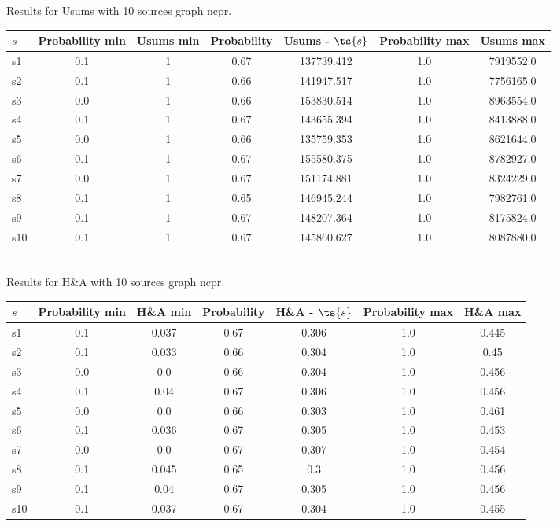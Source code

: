 \documentclass{article}
\begin{document}
\noindent Results for Usums with 10 sources graph ncpr.

\noindent\begin{tabular}{|l|c|c|c|c|c|c|}
\hline
$s$& Probability min & Usums min & Probability & Usums - $\ts{s}$ & Probability max & Usums max\\
\hline
s1 &0.1 & 1 & 0.67 & 137739.412 & 1.0 & 7919552.0\\
\hline
s2 &0.1 & 1 & 0.66 & 141947.517 & 1.0 & 7756165.0\\
\hline
s3 &0.0 & 1 & 0.66 & 153830.514 & 1.0 & 8963554.0\\
\hline
s4 &0.1 & 1 & 0.67 & 143655.394 & 1.0 & 8413888.0\\
\hline
s5 &0.0 & 1 & 0.66 & 135759.353 & 1.0 & 8621644.0\\
\hline
s6 &0.1 & 1 & 0.67 & 155580.375 & 1.0 & 8782927.0\\
\hline
s7 &0.0 & 1 & 0.67 & 151174.881 & 1.0 & 8324229.0\\
\hline
s8 &0.1 & 1 & 0.65 & 146945.244 & 1.0 & 7982761.0\\
\hline
s9 &0.1 & 1 & 0.67 & 148207.364 & 1.0 & 8175824.0\\
\hline
s10 &0.1 & 1 & 0.67 & 145860.627 & 1.0 & 8087880.0\\
\hline
\end{tabular}\\

\noindent Results for H\&A with 10 sources graph ncpr.

\noindent\begin{tabular}{|l|c|c|c|c|c|c|}
\hline
$s$& Probability min & H\&A min & Probability & H\&A - $\ts{s}$ & Probability max & H\&A max\\
\hline
s1 &0.1 & 0.037 & 0.67 & 0.306 & 1.0 & 0.445\\
\hline
s2 &0.1 & 0.033 & 0.66 & 0.304 & 1.0 & 0.45\\
\hline
s3 &0.0 & 0.0 & 0.66 & 0.304 & 1.0 & 0.456\\
\hline
s4 &0.1 & 0.04 & 0.67 & 0.306 & 1.0 & 0.456\\
\hline
s5 &0.0 & 0.0 & 0.66 & 0.303 & 1.0 & 0.461\\
\hline
s6 &0.1 & 0.036 & 0.67 & 0.305 & 1.0 & 0.453\\
\hline
s7 &0.0 & 0.0 & 0.67 & 0.307 & 1.0 & 0.454\\
\hline
s8 &0.1 & 0.045 & 0.65 & 0.3 & 1.0 & 0.456\\
\hline
s9 &0.1 & 0.04 & 0.67 & 0.305 & 1.0 & 0.456\\
\hline
s10 &0.1 & 0.037 & 0.67 & 0.304 & 1.0 & 0.455\\
\hline
\end{tabular}\\
\end{document}
